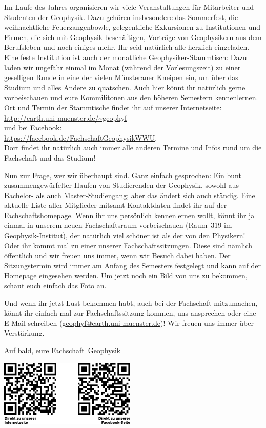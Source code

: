 \begin{multicols*}{2}
Im Laufe des Jahres organisieren wir viele Veranstaltungen für Mitarbeiter und Studenten der Geophysik. Dazu gehören insbesondere das Sommerfest, die weihnachtliche Feuerzangenbowle, gelegentliche Exkursionen zu Institutionen und Firmen, die sich mit Geophysik beschäftigen, Vorträge von Geophysikern aus dem Berufsleben und noch einiges mehr. Ihr seid natürlich alle herzlich eingeladen. Eine feste Institution ist auch der monatliche Geophysiker-Stammtisch: Dazu laden wir ungefähr einmal im Monat (während der Vorlesungszeit) zu einer geselligen Runde in eine der vielen Münsteraner Kneipen ein, um über das Studium und alles Andere zu quatschen. Auch hier könnt ihr natürlich gerne vorbeischauen und eure Kommilitonen aus den höheren Semestern kennenlernen. Ort und Termin der Stammtische findet ihr auf unserer Internetseite:\\
\url{http://earth.uni-muenster.de/~geophyf}\\
und bei Facebook:\\
\url{https://facebook.de/FachschaftGeophysikWWU}.\\
Dort findet ihr natürlich auch immer alle anderen Termine und Infos rund um die Fachschaft und das Studium!

Nun zur Frage, wer wir überhaupt sind. Ganz einfach gesprochen: Ein bunt zusammengewürfelter Haufen von Studierenden der Geophysik, sowohl aus Bachelor- als auch Master-Studiengang; aber das ändert sich auch ständig. Eine aktuelle Liste aller Mitglieder mitsamt Kontaktdaten findet ihr auf der Fachschaftshomepage. Wenn ihr uns persönlich kennenlernen wollt, könnt ihr ja einmal in unserem neuen Fachschaftsraum vorbeischauen (Raum~319 im Geophysik-Institut), der natürlich viel schöner ist als der von den Physikern! Oder ihr kommt mal zu einer unserer Fachschaftssitzungen. Diese sind nämlich öffentlich und wir freuen uns immer, wenn wir Besuch dabei haben. Der Sitzungstermin wird immer am Anfang des Semesters festgelegt und kann auf der Homepage eingesehen werden. Um jetzt noch ein Bild von uns zu bekommen, schaut euch einfach das Foto an.

Und wenn ihr jetzt Lust bekommen habt, auch bei der Fachschaft mitzumachen, könnt ihr einfach mal zur Fachschaftssitzung kommen, uns ansprechen oder eine E-Mail schreiben (\url{geophyf@earth.uni-muenster.de})! Wir freuen uns immer über Verstärkung.

Auf bald, eure Fachschaft~Geophysik

\begin{center}
\includegraphics[width=6.5cm]{res/fs_geophysik_qr_code.png}
\end{center}
\end{multicols*}

